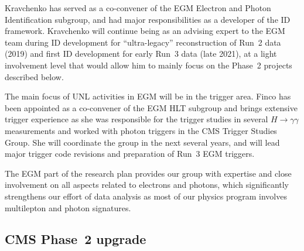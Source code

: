 Kravchenko has served as a co-convener of the EGM Electron and Photon Identification subgroup, and had major responsibilities as a developer of the ID framework. 
Kravchenko will continue being as an advising expert to the EGM team during ID development for ``ultra-legacy'' reconstruction of Run~2 data (2019) and first ID development for early Run~3 data (late 2021), at a light involvement level that would allow him to mainly focus on the Phase~2 projects described below.


The main focus of UNL activities in EGM will be in the trigger area. Finco has been appointed as a co-convener of the EGM HLT subgroup and brings extensive trigger experience as she was responsible for the trigger studies in several $H\to\gamma\gamma$ measurements and worked with photon triggers in the CMS Trigger Studies Group. She will coordinate the group in the next several years, and will lead major trigger code revisions and preparation of Run~3 EGM triggers.

The EGM part of the research plan provides our group with expertise and close involvement on all aspects related to electrons and photons, which significantly strengthens our effort of data analysis as most of our physics program involves multilepton and photon signatures.


\subsection{CMS Phase~2 upgrade}


